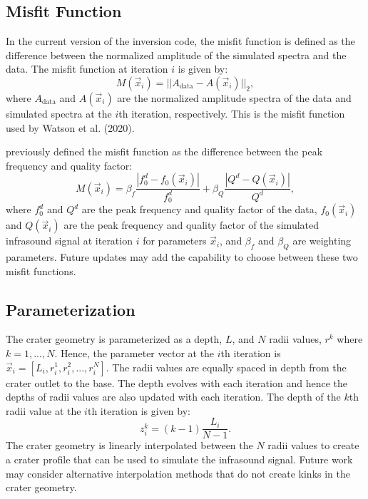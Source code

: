 \documentclass[10pt]{article}
\begin{document}
\subsection{Misfit Function}

In the current version of the inversion code, the misfit function is defined as the difference between the normalized amplitude of the simulated spectra and the data. The misfit function at iteration $i$ is given by:
\begin{equation}
	M(\vec{x}_i) = ||A_\text{data} - A(\vec{x}_i)||_2,
	\label{eq:misfit 2020}
\end{equation}
where $A_\text{data}$ and $A(\vec{x}_i)$ are the normalized amplitude spectra of the data and simulated spectra at the $i$th iteration, respectively. This is the misfit function used by Watson et al. (2020). 

\cite{Watson2019_infrasonic_resonance} previously defined the misfit function as the difference between the peak frequency and quality factor:
\begin{equation}
    M(\vec{x}_i) = \beta_f \frac{|f_0^d - f_0(\vec{x}_i)|}{f_0^d} + \beta_Q \frac{|Q^d - Q(\vec{x}_i)|}{Q^d},
    \label{eq:misfit 2019}
\end{equation}
where $f_0^d$ and $Q^d$ are the peak frequency and quality factor of the data, $f_0(\vec{x}_i)$ and $Q(\vec{x}_i)$ are the peak frequency and quality factor of the simulated infrasound signal at iteration $i$ for parameters $\vec{x}_i$, and $\beta_f$ and $\beta_Q$ are weighting parameters. Future updates may add the capability to choose between these two misfit functions. 

\subsection{Parameterization}

The crater geometry is parameterized as a depth, $L$, and $N$ radii values, $r^k$ where $k = 1,..., N$. Hence, the parameter vector at the $i$th iteration is $\vec{x}_i = [L_i, r_i^1, r_i^2, ..., r_i^N]$. The radii values are equally spaced in depth from the crater outlet to the base. The depth evolves with each iteration and hence the depths of radii values are also updated with each iteration. The depth of the $k$th radii value at the $i$th iteration is given by:
\begin{equation}
z_i^k = (k-1) \frac{L_i}{N-1}.
\end{equation}
The crater geometry is linearly interpolated between the $N$ radii values to create a crater profile that can be used to simulate the infrasound signal. Future work may consider alternative interpolation methods that do not create kinks in the crater geometry. 
\end{document}

